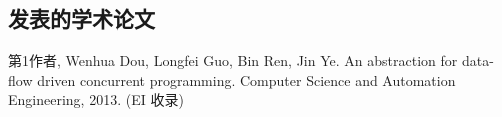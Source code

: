 \begin{resume}

  \section*{发表的学术论文} %

  \begin{enumerate}[{[}1{]}]
  \addtolength{\itemsep}{-.36\baselineskip}%
  \item 第1作者, Wenhua Dou, Longfei Guo, Bin Ren, Jin Ye. An abstraction for
    data-flow driven concurrent programming. Computer Science and Automation Engineering,
    2013. (EI 收录)
  \end{enumerate}

\end{resume}
